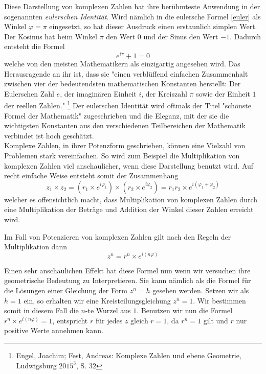 \documentclass[a4paper,12pt]{article} %
\begin{document}

Diese Darstellung von komplexen Zahlen hat ihre berühmteste Anwendung in der sogenannten \emph{eulerschen Identität}.
Wird nämlich in die eulersche Formel \eqref{euler} als Winkel $\varphi=\pi$ eingesetzt, so hat dieser Ausdruck einen erstaunlich simplen Wert.
Der Kosinus hat beim Winkel $\pi$ den Wert $0$ und der Sinus den Wert $-1$.
Dadurch entsteht die Formel
\[e^{i\pi}+1=0\]
welche von den meisten Mathematikern als einzigartig angesehen wird.
Das Herausragende an ihr ist, dass sie "{}einen verblüffend einfachen Zusammenhalt zwischen vier der bedeutendsten mathematischen Konstanten herstellt:
Der Eulerschen Zahl $e$, der imaginären Einheit $i$, der Kreiszahl $\pi$ sowie der Einheit $1$ der reellen Zahlen."
\footnote{Engel, Joachim; Fest, Andreas: Komplexe Zahlen und ebene Geometrie, Ludwigsburg $2015^3$, S. $32$}
Der eulerschen Identität wird oftmals der Titel "{}schönste Formel der Mathematik"{} zugeschrieben und die Eleganz, mit der sie die wichtigsten Konstanten aus den verschiedenen Teilbereichen der Mathematik verbindet ist hoch geschätzt.\\




Komplexe Zahlen, in ihrer Potenzform geschrieben, können eine Vielzahl von Problemen stark vereinfachen.
So wird zum Beispiel die Multiplikation von komplexen Zahlen viel anschaulicher, wenn diese Darstellung benutzt wird.
Auf recht einfache Weise entsteht somit der Zusammenhang
\[z_1\times z_2=(r_1 \times e^{i\varphi_1}) \times (r_2 \times e^{i\varphi_2})=r_1 r_2 \times e^{i(\varphi_1+\varphi_2)}\]
welcher es offensichtlich macht, dass Multiplikation von komplexen Zahlen durch eine Multiplikation der Beträge und Addition der Winkel dieser Zahlen erreicht wird.

Im Fall von Potenzieren von komplexen Zahlen gilt nach den Regeln der Multiplikation dann
\[z^n=r^n \times e^{i(n\varphi)}\]

Einen sehr anschaulichen Effekt hat diese Formel nun wenn wir versuchen ihre geometrische Bedeutung zu Interpretieren.
Sie kann nämlich als die Formel für die Lösungen einer Gleichung der Form $z^n=h$ gesehen werden.
Setzen wir als $h=1$ ein, so erhalten wir eine Kreisteilungsgleichung $z^n=1$. Wir bestimmen somit in diesem Fall die $n$-te Wurzel aus $1$.
Benutzen wir nun die Formel $r^n \times e^{i(n\varphi)}=1$, entspricht $r$ für jedes $z$ gleich $r=1$, da $r^n=1$ gilt und $r$ nur positive Werte annehmen kann.\\
\end{document}
